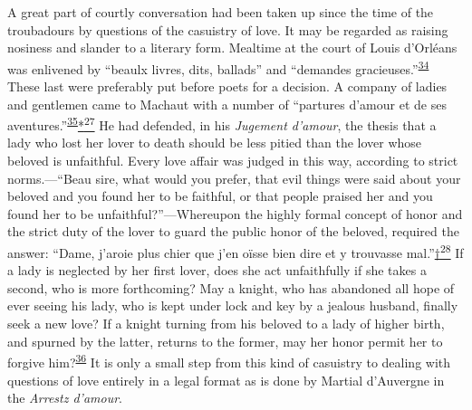 A great part of courtly conversation had been taken up since the time of
the troubadours by questions of the casuistry of love. It may be
regarded as raising nosiness and slander to a literary form. Mealtime at
the court of Louis d'Orléans was enlivened by ``beaulx livres, dits,
ballads'' and ``demandes
gracieuses.''\textsuperscript{\protect\hypertarget{11_Chapter_Four__THE_FORMS_OF_LOVE.xhtmlux5cux23id_1421}{\protect\hyperlink{23_NOTES.xhtmlux5cux23id_1422}{34}}}
These last were
\protect\hypertarget{11_Chapter_Four__THE_FORMS_OF_LOVE.xhtmlux5cux23page_144}{}{}preferably
put before poets for a decision. A company of ladies and gentlemen came
to Machaut with a number of ``partures d'amour et de ses
aventures.''\textsuperscript{\protect\hypertarget{11_Chapter_Four__THE_FORMS_OF_LOVE.xhtmlux5cux23id_1419}{\protect\hyperlink{23_NOTES.xhtmlux5cux23id_1420}{35}}}\protect\hypertarget{11_Chapter_Four__THE_FORMS_OF_LOVE.xhtmlux5cux23id_3153}{\protect\hyperlink{23_NOTES.xhtmlux5cux23id_3154}{*\textsuperscript{27}}}
He had defended, in his \emph{Jugement d'amour}, the thesis that a lady
who lost her lover to death should be less pitied than the lover whose
beloved is unfaithful. Every love affair was judged in this way,
according to strict norms.---``Beau sire, what would you prefer, that
evil things were said about your beloved and you found her to be
faithful, or that people praised her and you found her to be
unfaithful?''---Whereupon the highly formal concept of honor and the
strict duty of the lover to guard the public honor of the beloved,
required the answer: ``Dame, j'aroie plus chier que j'en oïsse bien dire
et y trouvasse
mal.''\protect\hypertarget{11_Chapter_Four__THE_FORMS_OF_LOVE.xhtmlux5cux23id_3155}{\protect\hyperlink{23_NOTES.xhtmlux5cux23id_3156}{†\textsuperscript{28}}}
If a lady is neglected by her first lover, does she act unfaithfully if
she takes a second, who is more forthcoming? May a knight, who has
abandoned all hope of ever seeing his lady, who is kept under lock and
key by a jealous husband, finally seek a new love? If a knight turning
from his beloved to a lady of higher birth, and spurned by the latter,
returns to the former, may her honor permit her to forgive
him?\textsuperscript{\protect\hypertarget{11_Chapter_Four__THE_FORMS_OF_LOVE.xhtmlux5cux23id_1417}{\protect\hyperlink{23_NOTES.xhtmlux5cux23id_1418}{36}}}
It is only a small step from this kind of casuistry to dealing with
questions of love entirely in a legal format as is done by Martial
d'Auvergne in the \emph{Arrestz d'amour}.

